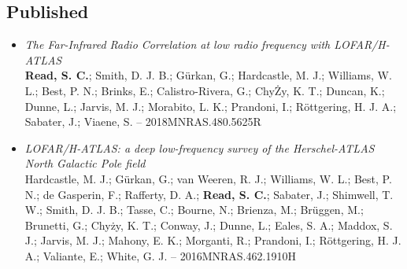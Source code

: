 \documentclass[letterpaper]{twentysecondcv} %
\begin{document}
\subsection{Published}
\begin{itemize}
     \item \textit{The Far-Infrared Radio Correlation at low radio frequency with
LOFAR/H-ATLAS}\\{\small \textbf{Read, S. C.}; Smith, D. J. B.; Gürkan, G.; Hardcastle, M. J.;
Williams, W. L.; Best, P. N.; Brinks, E.; Calistro-Rivera, G.; ChyŻy, K.
T.; Duncan, K.; Dunne, L.; Jarvis, M. J.; Morabito, L. K.; Prandoni, I.;
Röttgering, H. J. A.; Sabater, J.; Viaene, S. -- 2018MNRAS.480.5625R}
 \item \textit{LOFAR/H-ATLAS: a deep low-frequency survey of the Herschel-ATLAS North
Galactic Pole field}\\{\small Hardcastle, M. J.; Gürkan, G.; van Weeren, R. J.; Williams, W. L.; Best,
P. N.; de Gasperin, F.; Rafferty, D. A.; \textbf{Read, S. C.}; Sabater,
J.; Shimwell, T. W.; Smith, D. J. B.; Tasse, C.; Bourne, N.; Brienza,
M.; Brüggen, M.; Brunetti, G.; Chyży, K. T.; Conway, J.; Dunne, L.;
Eales, S. A.; Maddox, S. J.; Jarvis, M. J.; Mahony, E. K.; Morganti, R.;
Prandoni, I.; Röttgering, H. J. A.; Valiante, E.; White, G. J. -- 2016MNRAS.462.1910H}
\end{itemize}
\end{document}
